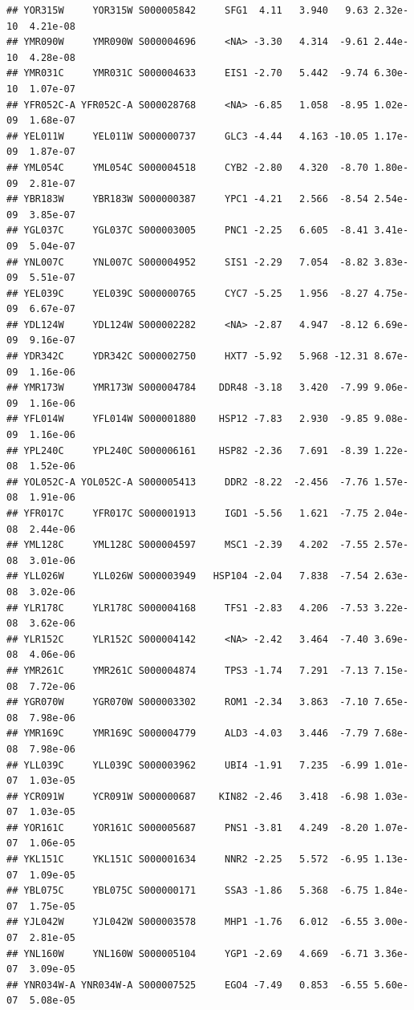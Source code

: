 \documentclass[
]{book}
\begin{document}
\begin{verbatim}
## YOR315W     YOR315W S000005842     SFG1  4.11   3.940   9.63 2.32e-10  4.21e-08
## YMR090W     YMR090W S000004696     <NA> -3.30   4.314  -9.61 2.44e-10  4.28e-08
## YMR031C     YMR031C S000004633     EIS1 -2.70   5.442  -9.74 6.30e-10  1.07e-07
## YFR052C-A YFR052C-A S000028768     <NA> -6.85   1.058  -8.95 1.02e-09  1.68e-07
## YEL011W     YEL011W S000000737     GLC3 -4.44   4.163 -10.05 1.17e-09  1.87e-07
## YML054C     YML054C S000004518     CYB2 -2.80   4.320  -8.70 1.80e-09  2.81e-07
## YBR183W     YBR183W S000000387     YPC1 -4.21   2.566  -8.54 2.54e-09  3.85e-07
## YGL037C     YGL037C S000003005     PNC1 -2.25   6.605  -8.41 3.41e-09  5.04e-07
## YNL007C     YNL007C S000004952     SIS1 -2.29   7.054  -8.82 3.83e-09  5.51e-07
## YEL039C     YEL039C S000000765     CYC7 -5.25   1.956  -8.27 4.75e-09  6.67e-07
## YDL124W     YDL124W S000002282     <NA> -2.87   4.947  -8.12 6.69e-09  9.16e-07
## YDR342C     YDR342C S000002750     HXT7 -5.92   5.968 -12.31 8.67e-09  1.16e-06
## YMR173W     YMR173W S000004784    DDR48 -3.18   3.420  -7.99 9.06e-09  1.16e-06
## YFL014W     YFL014W S000001880    HSP12 -7.83   2.930  -9.85 9.08e-09  1.16e-06
## YPL240C     YPL240C S000006161    HSP82 -2.36   7.691  -8.39 1.22e-08  1.52e-06
## YOL052C-A YOL052C-A S000005413     DDR2 -8.22  -2.456  -7.76 1.57e-08  1.91e-06
## YFR017C     YFR017C S000001913     IGD1 -5.56   1.621  -7.75 2.04e-08  2.44e-06
## YML128C     YML128C S000004597     MSC1 -2.39   4.202  -7.55 2.57e-08  3.01e-06
## YLL026W     YLL026W S000003949   HSP104 -2.04   7.838  -7.54 2.63e-08  3.02e-06
## YLR178C     YLR178C S000004168     TFS1 -2.83   4.206  -7.53 3.22e-08  3.62e-06
## YLR152C     YLR152C S000004142     <NA> -2.42   3.464  -7.40 3.69e-08  4.06e-06
## YMR261C     YMR261C S000004874     TPS3 -1.74   7.291  -7.13 7.15e-08  7.72e-06
## YGR070W     YGR070W S000003302     ROM1 -2.34   3.863  -7.10 7.65e-08  7.98e-06
## YMR169C     YMR169C S000004779     ALD3 -4.03   3.446  -7.79 7.68e-08  7.98e-06
## YLL039C     YLL039C S000003962     UBI4 -1.91   7.235  -6.99 1.01e-07  1.03e-05
## YCR091W     YCR091W S000000687    KIN82 -2.46   3.418  -6.98 1.03e-07  1.03e-05
## YOR161C     YOR161C S000005687     PNS1 -3.81   4.249  -8.20 1.07e-07  1.06e-05
## YKL151C     YKL151C S000001634     NNR2 -2.25   5.572  -6.95 1.13e-07  1.09e-05
## YBL075C     YBL075C S000000171     SSA3 -1.86   5.368  -6.75 1.84e-07  1.75e-05
## YJL042W     YJL042W S000003578     MHP1 -1.76   6.012  -6.55 3.00e-07  2.81e-05
## YNL160W     YNL160W S000005104     YGP1 -2.69   4.669  -6.71 3.36e-07  3.09e-05
## YNR034W-A YNR034W-A S000007525     EGO4 -7.49   0.853  -6.55 5.60e-07  5.08e-05

\end{verbatim}
\end{document}
